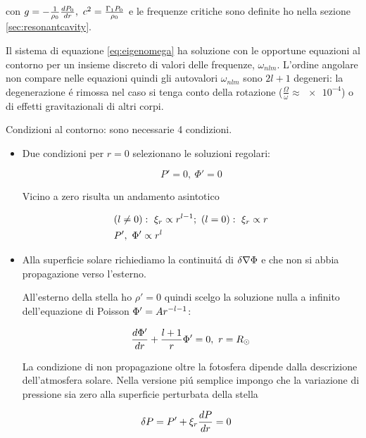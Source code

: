 \documentclass[../main.tex]{subfiles}
\begin{document}
con $g=-\frac{1}{\rho_0}\TDy{r}{P_0},\ c^2=\frac{\Gamma_1P_0}{\rho_0}$ e le frequenze critiche sono definite ho nella sezione \ref{sec:resonantcavity}.


Il sistema di equazione \eqref{eq:eigenomega} ha soluzione con le opportune equazioni al contorno per un insieme discreto di valori delle frequenze, $\omega_{nlm}$. L'ordine angolare non compare nelle equazioni quindi gli autovalori $\omega_{nlm}$ sono $2l+1$ degeneri: la degenerazione \'e rimossa nel caso si tenga conto della rotazione ($\frac{\Omega}{\omega}\approx\num{e-4}$) o di effetti gravitazionali di altri corpi.


Condizioni al contorno: sono necessarie 4 condizioni.

\begin{itemize}
\item Due condizioni per $r=0$ selezionano le soluzioni regolari:

\begin{equation}
P'=0,\ \Phi'=0
\end{equation}

Vicino a zero risulta un andamento asintotico

\begin{align*}
&(l\neq0):\ \xi_r\propto r\expy{l-1};\ (l=0):\ \xi_r\propto r\\
&P',\ \Phi'\propto r^l
\end{align*}

\item Alla superficie solare richiediamo la continuit\'a di $\Lvar{\nabla\Phi}$ e che non si abbia propagazione verso l'esterno.

All'esterno della stella ho $\rho'=0$ quindi scelgo la soluzione nulla a infinito dell'equazione di Poisson $\Phi'=Ar\expy{-l-1}$:

\begin{equation}
\TDy{r}{\Phi'}+\frac{l+1}{r}\Phi'=0,\ r=\rsun{}    
\end{equation}

La condizione di non propagazione oltre la fotosfera dipende dalla descrizione dell'atmosfera solare. Nella versione pi\'u semplice impongo che la variazione di pressione sia zero alla superficie perturbata della stella

\begin{align}
&\Lvar{P}=P'+\xi_r\TDy{r}{P}=0
\end{align}

\end{itemize}
\end{document}
